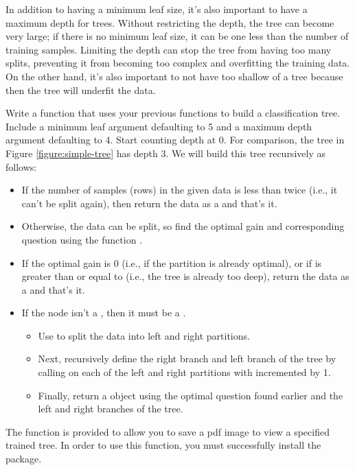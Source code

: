 In addition to having a minimum leaf size, it's also important to have a maximum depth for trees.
Without restricting the depth, the tree can become very large; if there is no minimum leaf size, it can be one less than the number of training samples.
Limiting the depth can stop the tree from having too many splits, preventing it from becoming too complex and overfitting the training data. 
On the other hand, it's also important to not have too shallow of a tree because then the tree will underfit the data.

\begin{problem}
Write a function  that uses your previous functions to build a classification tree.
Include a minimum leaf argument defaulting to 5 and a maximum depth argument defaulting to 4.
Start counting depth at 0.
For comparison, the tree in Figure \ref{figure:simple-tree} has depth 3.
We will build this tree recursively as follows:

\begin{itemize}
\item If the number of samples (rows) in the given data is less than twice  (i.e., it can't be split again), then return the data as a  and that's it.
\item
Otherwise, the data can be split, so find the optimal gain and corresponding question using the function .
\item
If the optimal gain is 0 (i.e., if the partition is already optimal), or if  is greater than or equal to  (i.e., the tree is already too deep), return the data as a  and that's it.

\item
If the node isn't a , then it must be a .
\begin{itemize}
\item Use  to split the data into left and right partitions.
\item Next, recursively define the right branch and left branch of the tree by calling  on each of the left and right partitions with  incremented by 1.
\item Finally, return a  object using the optimal question found earlier and the left and right branches of the tree.
\end{itemize}
\end{itemize}

The function  is provided to allow you to save a pdf image to view a specified trained tree.
In order to use this function, you must successfully install the  package.


\end{problem}

